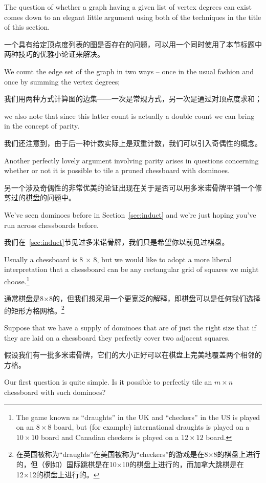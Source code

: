 The question of whether a graph having a given list of vertex degrees
can exist comes down to an elegant little argument using both of the 
techniques in the title of this section.

一个具有给定顶点度列表的图是否存在的问题，可以用一个同时使用了本节标题中两种技巧的优雅小论证来解决。

We count the edge set of the 
graph in two ways -- once in the usual fashion and once by summing the 
vertex degrees;

我们用两种方式计算图的边集——一次是常规方式，另一次是通过对顶点度求和；

we also note that since this latter count is actually
a double count we can bring in the concept of parity.

我们还注意到，由于后一种计数实际上是双重计数，我们可以引入奇偶性的概念。

Another perfectly lovely argument involving parity arises in questions
concerning whether or not it is possible to tile a pruned chessboard 
with dominoes.

另一个涉及奇偶性的非常优美的论证出现在关于是否可以用多米诺骨牌平铺一个修剪过的棋盘的问题中。

We've seen dominoes before in Section~\ref{sec:induct}
and we're just hoping you've run across chessboards before.

我们在~\ref{sec:induct}节见过多米诺骨牌，我们只是希望你以前见过棋盘。

Usually
a chessboard is 8 $\times$ 8, but we would like to adopt a more
liberal interpretation that a chessboard can be any rectangular grid
of squares we might choose.\footnote{The game known as ``draughts'' in the
UK and ``checkers'' in the US is played on an $8 \times 8$ board, but 
(for example) international draughts is played on a $10 \times 10$ 
board and Canadian checkers is played on a $12 \times 12$ board.}

通常棋盘是8×8的，但我们想采用一个更宽泛的解释，即棋盘可以是任何我们选择的矩形方格网格。\footnote{在英国被称为“draughts”在美国被称为“checkers”的游戏是在8×8的棋盘上进行的，但（例如）国际跳棋是在10×10的棋盘上进行的，而加拿大跳棋是在12×12的棋盘上进行的。}

Suppose that we have a supply of dominoes that are of just the right
size that if they are laid on a chessboard they perfectly cover two
adjacent squares.

假设我们有一批多米诺骨牌，它们的大小正好可以在棋盘上完美地覆盖两个相邻的方格。

Our first question is quite simple.  Is it possible
to perfectly tile an $m \times n$ chessboard with such dominoes?

